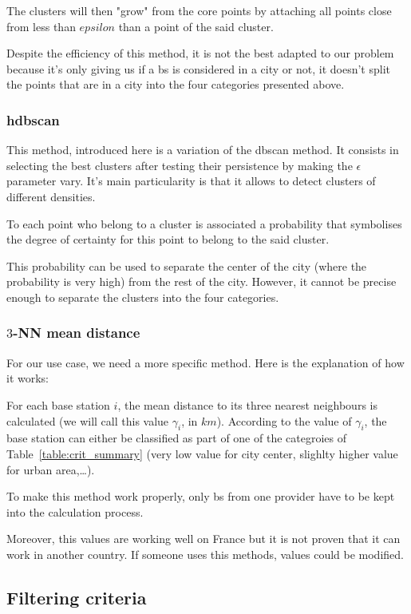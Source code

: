 \documentclass[lettersize,journal,english]{IEEEtran}
\begin{document}
The clusters will then "grow" from the core points by attaching all points close from less than \emph{$epsilon$} than a point of the said 
cluster.

Despite the efficiency of this method, it is not the best adapted to our problem because it's only giving us if a \acrshort{bs} is considered 
in a city or not, it doesn't split the points that are in a city into the four categories presented above.

\subsubsection{\acrshort{hdbscan}}
This method, introduced here \cite{10.1007/978-3-642-37456-2_14} is a variation of the \acrshort{dbscan} method. It consists
in selecting the best clusters after testing their persistence by making the $\epsilon$ parameter vary. It's main particularity
is that it allows to detect clusters of different densities.

To each point who belong to a cluster is associated a probability that symbolises the degree of certainty for this point to belong
to the said cluster.

This probability can be used to separate the center of the city (where the probability is very high) from the rest of the city. However,
it cannot be precise enough to separate the clusters into the four categories.

\subsubsection{$3$-NN mean distance}
For our use case, we need a more specific method. Here is the explanation of how it works:

For each base station $i$, the mean distance to its three nearest neighbours is calculated (we will call this value $\gamma_i$, in 
$\unit{km}$). According to the value of $\gamma_i$, the base station can either be classified as part of one of the categroies of 
Table~\ref{table:crit_summary} (very low value for city center, slighlty higher value for urban area,\dots).

To make this method work properly, only \acrshort{bs} from one provider have to be kept into the calculation process.

Moreover, this values are working well on France but it is not proven that it can work in another country. If someone uses this methods, 
values could be modified.

\subsection{Filtering criteria}
\end{document}
